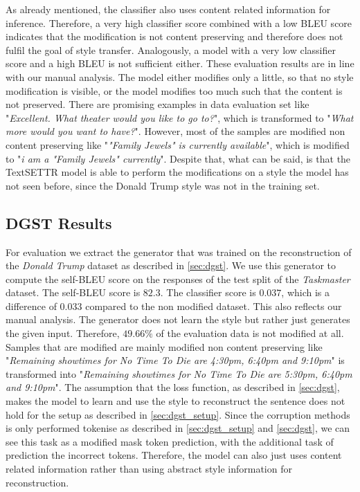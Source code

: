 \documentclass[twocolumn]{tum-article}
\begin{document}
As already mentioned, the classifier also uses content related information for inference. Therefore, a very high classifier score combined with a low BLEU score indicates that the modification is not content preserving and therefore does not fulfil the goal of style transfer. Analogously, a model with a very low classifier score and a high BLEU is not sufficient either. These evaluation results are in line with our manual analysis. The model either modifies only a little, so that no style modification is visible, or the model modifies too much such that the content is not preserved. There are promising examples in data evaluation set like "\textit{Excellent. What theater would you like to go to?}", which is transformed to "\textit{What more would you want to have?}". However, most of the samples are modified non content preserving like "\textit{"Family Jewels" is currently available}", which is modified to "\textit{i am a "Family Jewels" currently}". Despite that, what can be said, is that the TextSETTR model is able to perform the modifications on a style the model has not seen before, since the Donald Trump style was not in the training set. 
\subsection{DGST Results}
For evaluation we extract the generator that was trained on the reconstruction of the \textit{Donald Trump} dataset as described in \autoref{sec:dgst}. We use this generator to compute the self-BLEU score on the responses of the test split of the \textit{Taskmaster} dataset. The self-BLEU score is $82.3$. The classifier score is $0.037$, which is a difference of $0.033$ compared to the non modified dataset. This also reflects our manual analysis. The generator does not learn the style but rather just generates the given input. Therefore, $49.66\%$ of the evaluation data is not modified at all. Samples that are modified are mainly modified non content preserving like "\textit{Remaining showtimes for No Time To Die are 4:30pm, 6:40pm and 9:10pm}" is transformed into "\textit{Remaining showtimes for No Time To Die are 5:30pm, 6:40pm and 9:10pm}". The assumption that the loss function, as described in \autoref{sec:dgst}, makes the model to learn and use the style to reconstruct the sentence does not hold for the setup as described in \autoref{sec:dgst_setup}. Since the corruption methods is only performed tokenise as described in \autoref{sec:dgst_setup} and \autoref{sec:dgst}, we can see this task as a modified mask token prediction, with the additional task of prediction the incorrect tokens. Therefore, the model can also just uses content related information rather than using abstract style information for reconstruction. 
\end{document}
